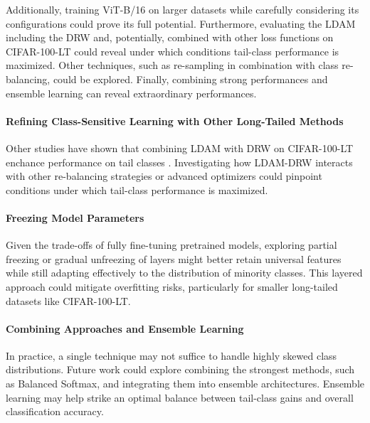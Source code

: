 Additionally, training ViT-B/16 on larger datasets while carefully considering its configurations could prove its full potential. Furthermore, evaluating the LDAM including the DRW and, potentially, combined with other loss functions on CIFAR-100-LT could reveal under which conditions tail-class performance is maximized. Other techniques, such as re-sampling in combination with class re-balancing, could be explored. Finally, combining strong performances and ensemble learning can reveal extraordinary performances.

\paragraph{Refining Class-Sensitive Learning with Other Long-Tailed Methods}
Other studies have shown that combining LDAM with DRW on CIFAR-100-LT enchance performance on tail classes \cite{cao2019learningimbalanceddatasetslabeldistributionaware,menon2021longtaillearninglogitadjustment}. Investigating how LDAM-DRW interacts with other re-balancing strategies or advanced optimizers could pinpoint conditions under which tail-class performance is maximized.

\paragraph{Freezing Model Parameters}
Given the trade-offs of fully fine-tuning pretrained models, exploring partial freezing or gradual unfreezing of layers might better retain universal features while still adapting effectively to the distribution of minority classes. This layered approach could mitigate overfitting risks, particularly for smaller long-tailed datasets like CIFAR-100-LT.

\paragraph{Combining Approaches and Ensemble Learning}
In practice, a single technique may not suffice to handle highly skewed class distributions. Future work could explore combining the strongest methods, such as Balanced Softmax, and integrating them into ensemble architectures. Ensemble learning may help strike an optimal balance between tail-class gains and overall classification accuracy.



